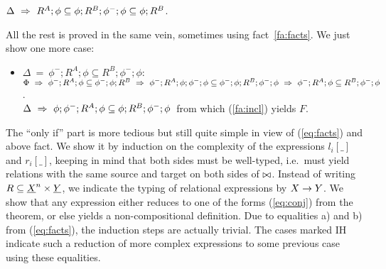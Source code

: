 \documentclass[10pt]{article}
\begin{document}
\begin{Proof}
\begin{enumerate}
$\Delta\ \impl\ R^A;\phi\subseteq\phi;R^B;\phi^-;\phi\subseteq\phi;R^B$.
\end{enumerate}
%
All the rest is proved in the same vein, sometimes using
fact~\ref{fa:facts}. We just show one more case:
\begin{itemize}\MyLPar
\item
$\Delta\ =\ \phi^-;R^A;\phi\subseteq R^B;\phi^-;\phi:$ \\
$\Phi\ \impl\ \phi^-;R^A;\phi\subseteq \phi^-;\phi;R^B\ 
    \impl\ \phi^-;R^A;\phi;\phi^-;\phi\subseteq\phi^-;\phi;R^B;\phi^-;\phi\
    \impl\ \phi^-;R^A;\phi\subseteq R^B;\phi^-;\phi$. \\
$\Delta\ \impl\ \phi;\phi^-;R^A;\phi\subseteq\phi;R^B;\phi^-;\phi$\ 
    from which (\ref{fa:incl}) yields $F$.
\end{itemize}\vspace*{-4ex}
\end{Proof}


\noindent
The ``only if'' part is more tedious but still quite simple in view of
(\ref{eq:facts}) and above fact.  We show it by induction on the complexity of the
expressions $l_i[\_]$ and $r_i[\_]$, keeping in mind that both sides
must be well-typed, i.e.\ must yield relations with the same source
and target on both sides of $\bowtie$. 
Instead of writing $R\subseteq \underline {X}^n\times \underline {Y}$,
we indicate the typing of relational expressions by $X\rightarrow Y$.  We
show that any expression either reduces to one of the forms
(\ref{eq:conj}) from the theorem, or else yields a non-compositional
definition. Due to equalities a) and b) from (\ref{eq:facts}), the
induction steps are actually trivial. The cases marked IH indicate
such a reduction of more complex expressions to some previous case
using these equalities.
\end{document}

